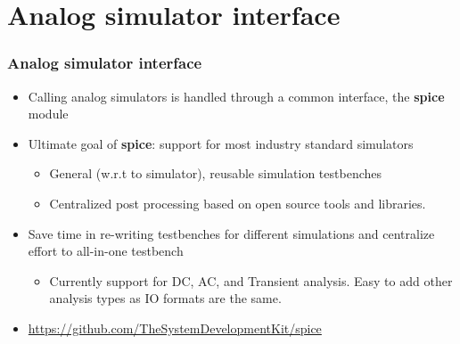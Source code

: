 \documentclass[logo=bluequo,normaltitle]{aaltoslides}
\newcommand{\sectname}{Section Name}
\begin{document}
\renewcommand{\sectname}{Analog simulator interface}
\section{\sectname}
\begin{frame}[t]
    \frametitle{\sectname}
    \begin{itemize}
        \item Calling analog simulators is handled through a common interface, the \textbf{spice} module
        \item Ultimate goal of \textbf{spice}: support for most industry standard simulators
        \begin{itemize}
            \item General (w.r.t to simulator), reusable simulation testbenches
            \item Centralized post processing based on open source tools and
                libraries.
        \end{itemize}
            \item Save time in re-writing testbenches for different simulations and centralize effort to all-in-one testbench
        \begin{itemize}
        \item Currently support for DC, AC, and Transient analysis. Easy to
            add other analysis types as IO formats are the same. 
        \end{itemize}
        \item \url{https://github.com/TheSystemDevelopmentKit/spice}
    \end{itemize}
\end{frame}

\renewcommand{\sectname}{Digital simulator interface}
\end{document}
